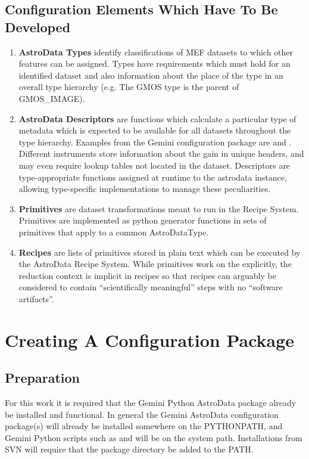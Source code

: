\documentclass[letterpaper,10pt,english]{sphinxmanual}
\begin{document}
\subsection{Configuration Elements Which Have To Be  Developed}
\label{configElements:configuration-elements-which-have-to-be-developed}\begin{enumerate}
\item {} 
\textbf{AstroData Types} identify classifications of MEF datasets to which other
features can be assigned. Types have requirements which must hold for
an identified dataset and also information about the place of the type in
an overall type hierarchy (e.g. The GMOS type is the parent of GMOS\_IMAGE).

\item {} 
\textbf{AstroData Descriptors} are functions which calculate a particular type
of metadata which is expected to be available for all datasets throughout
the type hierarchy. Examples from the Gemini configuration package are 
and .  Different instruments
store information about the gain in unique headers, and may even require
lookup tables not located in the dataset.  Descriptors are type-appropriate
functions assigned at runtime to the astrodata instance, allowing
type-specific implementations to manage these peculiarities.

\item {} 
\textbf{Primitives} are dataset transformations meant to run in the Recipe System.
Primitives are implemented as python generator functions in sets of primitives
that apply to a common AstroDataType.

\item {} 
\textbf{Recipes} are lists of primitives stored in plain text which can be executed
by the AstroData Recipe System. While primitives work on the  explicitly, the reduction context is implicit in recipes
so that recipes can arguably be considered to contain
``scientifically meaningful'' steps with no ``software artifacts''.

\end{enumerate}


\section{Creating A Configuration Package}
\label{startingTheConfig:creating-a-configuration-package}\label{startingTheConfig::doc}

\subsection{Preparation}
\label{startingTheConfig:preparation}
For this work it is required that the Gemini Python AstroData package already
be installed and
functional. In general the Gemini AstroData configuration package(s) will
already
be installed somewhere on the PYTHONPATH, and Gemini Python scripts such
as  and
 will be on the system path.  Installations from SVN will
require that the  package directory be added to the PATH.
\end{document}
